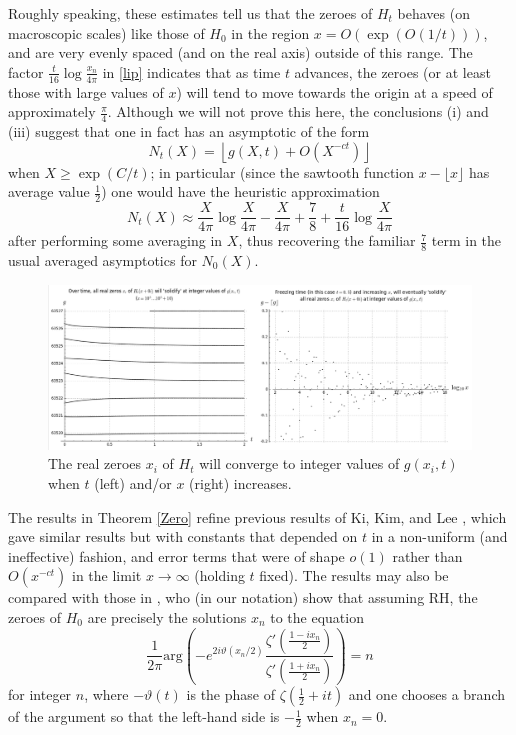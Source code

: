 Roughly speaking, these estimates tell us that the zeroes of $H_t$ behaves (on macroscopic scales) like those of $H_0$ in the region $x = O(\exp(O(1/t)))$, and are very evenly spaced (and on the real axis) outside of this range.  The factor $\frac{t}{16} \log \frac{x_n}{4\pi}$ in \eqref{lip} indicates that as time $t$ advances, the zeroes (or at least those with large values of $x$) will tend to move towards the origin at a speed of approximately $\frac{\pi}{4}$.  Although we will not prove this here, the conclusions (i) and (iii) suggest that one in fact has an asymptotic of the form
$$ N_t(X) = \left\lfloor g(X,t) + O( X^{-ct} ) \right\rfloor$$
when $X \geq \exp(C/t)$; in particular (since the sawtooth function $x - \lfloor x \rfloor$ has average value $\frac{1}{2}$) one would have the heuristic approximation
$$ N_t(X) \approx \frac{X}{4\pi} \log \frac{X}{4\pi} - \frac{X}{4\pi} + \frac{7}{8} + \frac{t}{16} \log \frac{X}{4\pi} $$
 after performing some averaging in $X$, thus recovering the familiar $\frac{7}{8}$ term in the usual averaged asymptotics for $N_0(X)$.

\begin{figure}[h!]
  \includegraphics[width=1.0\linewidth]{Integerconvergence_t_and_x_direction.png}
  \caption{The real zeroes $x_i$ of $H_t$ will converge to integer values of $g(x_i,t)$ when $t$ (left) and/or $x$ (right) increases.}
\label{integer_conv_zeros}
\end{figure}

The results in Theorem \ref{Zero} refine previous results of Ki, Kim, and Lee \cite[Theorems 1.3, 1.4]{kkl}, which gave similar results but with constants that depended on $t$ in a non-uniform (and ineffective) fashion, and error terms that were of shape $o(1)$ rather than $O(x^{-ct})$ in the limit $x \to \infty$ (holding $t$ fixed).  The results may also be compared with those in \cite{arias-lune}, who (in our notation) show that assuming RH, the zeroes of $H_0$ are precisely the solutions $x_n$ to the equation
$$ \frac{1}{2\pi} \mathrm{arg}\left( - e^{2 i \vartheta(x_n/2)} \frac{\zeta'(\frac{1-ix_n}{2})}{\zeta'(\frac{1+ix_n}{2})}\right) = n $$
for integer $n$, where $-\vartheta(t)$ is the phase of $\zeta(\frac{1}{2}+it)$ and one chooses a branch of the argument so that the left-hand side is $-\frac{1}{2}$ when $x_n=0$.

